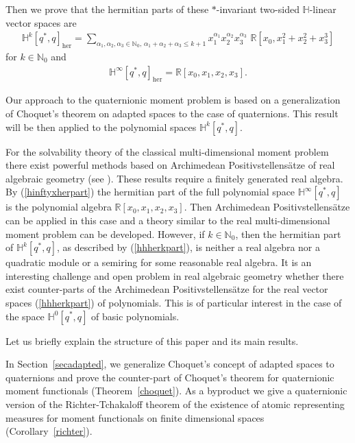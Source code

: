 \documentclass[11pt,a4paper]{amsart}
\theoremstyle{definition}
\begin{document}
Then we prove that the hermitian parts of these $*$-invariant two-sided
$\mathbb{H}$-linear vector spaces are
%
\begin{align}
\label{hhherkpart}
\mathbb{H}^{k}[q^{*},q]_{\mathrm{her}}=\sum _{\alpha _{1},\alpha _{2},
\alpha _{3}\in \mathbb{N}_{0}, \, \alpha _{1}+\alpha _{2}+\alpha _{3}
\leq k+1} x_{1}^{\alpha _{1}}x_{2}^{\alpha _{2}}x_{3}^{\alpha _{3}}\,
\, \mathbb{R}[x_{0},x_{1}^{2}+x_{2}^{2}+x_{3}^{3}]
\end{align}
%
for $k\in \mathbb{N}_{0}$ and
%
\begin{align}
\label{hinftyxherpart}
\mathbb{H}^{\infty}[q^{*},q]_{\mathrm{her}}=\mathbb{R}[x_{0},x_{1},x_{2},x_{3}].
\end{align}

Our approach to the quaternionic moment problem is based on a generalization
of Choquet's theorem on adapted spaces to the case of quaternions. This
result will be then applied to the polynomial spaces
$ \mathbb{H}^{k}[q^{*}, q]$.

For the solvability theory of the classical multi-dimensional moment problem
there exist powerful methods based on Archimedean Positivstellens\"atze
of real algebraic geometry (see \cite[Chapter 13]{Schmudgen2017}). These
results require a finitely generated real algebra. By (\ref{hinftyxherpart})
the hermitian part of the full polynomial space
$ \mathbb{H}^{\infty}[q^{*}, q]$ is the polynomial algebra
$\mathbb{R}[x_{0},x_{1},x_{2},x_{3}]$. Then Archimedean Positivstellens\"atze
can be applied in this case and a theory similar to the real multi-dimensional
moment problem can be developed. However, if $k\in \mathbb{N}_{0}$, then
the hermitian part of $ \mathbb{H}^{k}[q^{*}, q]$, as described by (\ref{hhherkpart}),
is neither a real algebra nor a quadratic module or a semiring for some
reasonable real algebra. It is an interesting challenge and open problem
in real algebraic geometry whether there exist counter-parts of the Archimedean
Positivstellens\"atze for the real vector spaces (\ref{hhherkpart}) of
polynomials. This is of particular interest in the case of the space
$ \mathbb{H}^{0}[q^{*}, q]$ of basic polynomials.



Let us briefly explain the structure of this paper and its main results.

In Section~\ref{secadapted}, we generalize Choquet's concept of adapted spaces
to quaternions and prove the counter-part of Choquet's theorem for quaternionic
moment functionals (Theorem~\ref{choquet}). As a byproduct we give a quaternionic
version of the Richter-Tchakaloff theorem of the existence of atomic representing
measures for moment functionals on finite dimensional spaces (Corollary~\ref{richter}).
\end{document}
